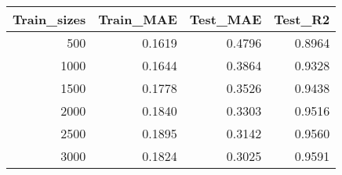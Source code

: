 \begin{tabular}{rrrr}
\toprule
Train_sizes & Train_MAE & Test_MAE & Test_R2 \\
\midrule
500 & 0.1619 & 0.4796 & 0.8964 \\
1000 & 0.1644 & 0.3864 & 0.9328 \\
1500 & 0.1778 & 0.3526 & 0.9438 \\
2000 & 0.1840 & 0.3303 & 0.9516 \\
2500 & 0.1895 & 0.3142 & 0.9560 \\
3000 & 0.1824 & 0.3025 & 0.9591 \\
\bottomrule
\end{tabular}

